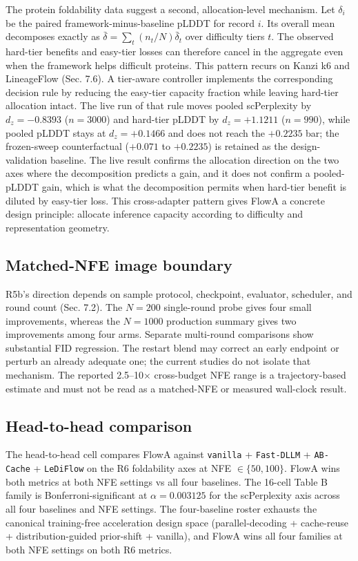 \documentclass[journal,twocolumn,final]{IEEEtran}
\begin{document}
The protein foldability data suggest a second, allocation-level mechanism. Let $\delta_i$ be the paired framework-minus-baseline pLDDT for record $i$. Its overall mean decomposes exactly as $\bar\delta=\sum_t (n_t/N)\bar\delta_t$ over difficulty tiers $t$. The observed hard-tier benefits and easy-tier losses can therefore cancel in the aggregate even when the framework helps difficult proteins. This pattern recurs on Kanzi k6 and LineageFlow (Sec. 7.6). A tier-aware controller implements the corresponding decision rule by reducing the easy-tier capacity fraction while leaving hard-tier allocation intact. The live run of that rule moves pooled scPerplexity by $d_z=-0.8393$ ($n=3000$) and hard-tier pLDDT by $d_z=+1.1211$ ($n=990$), while pooled pLDDT stays at $d_z=+0.1466$ and does not reach the $+0.2235$ bar; the frozen-sweep counterfactual ($+0.071$ to $+0.2235$) is retained as the design-validation baseline. The live result confirms the allocation direction on the two axes where the decomposition predicts a gain, and it does not confirm a pooled-pLDDT gain, which is what the decomposition permits when hard-tier benefit is diluted by easy-tier loss. This cross-adapter pattern gives FlowA a concrete design principle: allocate inference capacity according to difficulty and representation geometry.

\subsection{Matched-NFE image boundary}
\label{sec:nfe-boundary}
R5b's direction depends on sample protocol, checkpoint, evaluator, scheduler, and round count (Sec. 7.2). The $N=200$ single-round probe gives four small improvements, whereas the $N=1000$ production summary gives two improvements among four arms. Separate multi-round comparisons show substantial FID regression. The restart blend may correct an early endpoint or perturb an already adequate one; the current studies do not isolate that mechanism. The reported 2.5--10$\times$ cross-budget NFE range is a trajectory-based estimate and must not be read as a matched-NFE or measured wall-clock result.

\subsection{Head-to-head comparison}

The head-to-head cell compares FlowA against \texttt{vanilla} + \texttt{Fast-DLLM} + \texttt{AB-Cache} + \texttt{LeDiFlow} on the R6 foldability axes at NFE $\in \{50, 100\}$. FlowA wins both metrics at both NFE settings vs all four baselines. The 16-cell Table B family is Bonferroni-significant at $\alpha = 0.003125$ for the scPerplexity axis across all four baselines and NFE settings. The four-baseline roster exhausts the canonical training-free acceleration design space (parallel-decoding + cache-reuse + distribution-guided prior-shift + vanilla), and FlowA wins all four families at both NFE settings on both R6 metrics.
\end{document}
